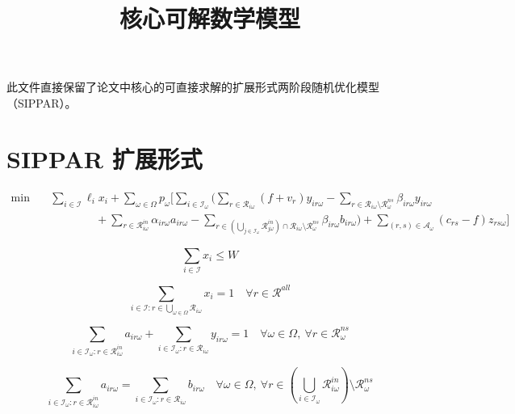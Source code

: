 \documentclass{article}
\title{核心可解数学模型}
\author{}
\date{}
\begin{document}
\maketitle

此文件直接保留了论文中核心的可直接求解的扩展形式两阶段随机优化模型（SIPPAR）。 

\section{SIPPAR 扩展形式}

\begin{equation}
\begin{aligned}
\min \quad
& \sum_{i\in\mathcal{I}} \ell_i x_i
+ \sum_{\omega\in\Omega} p_\omega
\Bigg[
\sum_{i\in\mathcal{I}_\omega}
\Bigg(
\sum_{r\in\mathcal{R}_{i\omega}} (f+v_r)y_{ir\omega}
- \sum_{r\in\mathcal{R}_{i\omega}\setminus \mathcal{R}_\omega^{ns}} \beta_{ir\omega} y_{ir\omega} \\
& \qquad\qquad
+ \sum_{r\in\mathcal{R}_{i\omega}^{in}} \alpha_{ir\omega} a_{ir\omega}
- \sum_{r\in\left(\bigcup_{j\in\mathcal{I}_\omega}\mathcal{R}_{j\omega}^{in}\right)\cap\mathcal{R}_{i\omega}\setminus \mathcal{R}_\omega^{ns}} \beta_{ir\omega} b_{ir\omega}
\Bigg)
+ \sum_{(r,s)\in\mathcal{A}_\omega} (c_{rs}-f) z_{rs\omega}
\Bigg]
\end{aligned}
\tag{3}
\end{equation}

\begin{equation}
\sum_{i\in\mathcal{I}} x_i \le W
\tag{4}
\end{equation}

\begin{equation}
\sum_{i\in\mathcal{I}: r\in \bigcup_{\omega\in\Omega}\mathcal{R}_{i\omega}} x_i = 1
\quad \forall r\in\mathcal{R}^{all}
\tag{5}
\end{equation}

\begin{equation}
\sum_{i\in\mathcal{I}_\omega: r\in\mathcal{R}_{i\omega}^{in}} a_{ir\omega}
+ \sum_{i\in\mathcal{I}_\omega: r\in\mathcal{R}_{i\omega}} y_{ir\omega} = 1
\quad \forall \omega\in\Omega,\ \forall r\in\mathcal{R}_\omega^{ns}
\tag{6}
\end{equation}

\begin{equation}
\sum_{i\in\mathcal{I}_\omega: r\in\mathcal{R}_{i\omega}^{in}} a_{ir\omega}
=
\sum_{i\in\mathcal{I}_\omega: r\in\mathcal{R}_{i\omega}} b_{ir\omega}
\quad
\forall \omega\in\Omega,\ \forall r\in
\left(\bigcup_{i\in\mathcal{I}_\omega}\mathcal{R}_{i\omega}^{in}\right)\setminus \mathcal{R}_\omega^{ns}
\tag{7}
\end{equation}
\end{document}
